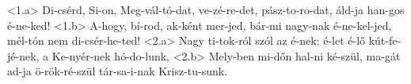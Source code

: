 \documentclass[twoside]{article}
\begin{document}
\begin{gregosheet}
            {<1.a> Di-csérd, Si-on, Meg-vál-tó-dat, ve-zé-re-det, pász-to-ro-dat, áld-ja han-gos é-ne-ked! <1.b> A-hogy, bí-rod, ak-ként mer-jed, bár-mi nagy-nak é-ne-kel-jed, mél-tón nem di-csér-he-ted! <2.a> Nagy ti-tok-ról szól az é-nek: é-let é-lő kút-fe-jé-nek, a Ke-nyér-nek hó-do-lunk, <2.b> Mely-ben mi-dőn hal-ni ké-szül, ma-gát ad-ja ö-rök-ré-szül tár-sa-i-nak Krisz-tu-sunk.}
\end{gregosheet}
\end{document}
